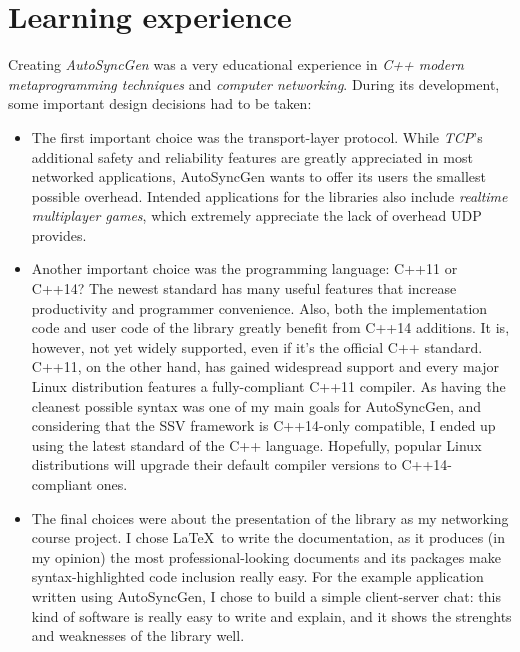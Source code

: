 \documentclass{report}
\begin{document}
            \section{Learning experience}

                Creating \emph{AutoSyncGen} was a very educational experience in \emph{C++ modern metaprogramming techniques} and \emph{computer networking}.
                During its development, some important design decisions had to be taken:

                \begin{itemize}
                  \item The first important choice was the transport-layer protocol. While \emph{TCP}'s additional safety and reliability features are greatly appreciated in most networked applications, AutoSyncGen wants to offer its users the smallest possible overhead. Intended applications for the libraries also include \emph{realtime multiplayer games}, which extremely appreciate the lack of overhead UDP provides.
                  \item Another important choice was the programming language: C++11 or C++14? The newest standard has many useful features that increase productivity and programmer convenience. Also, both the implementation code and user code of the library greatly benefit from C++14 additions. It is, however, not yet widely supported, even if it's the official C++ standard.
                  C++11, on the other hand, has gained widespread support and every major Linux distribution features a fully-compliant C++11 compiler.
                  As having the cleanest possible syntax was one of my main goals for AutoSyncGen, and considering that the SSV framework is C++14-only compatible, I ended up using the latest standard of the C++ language. Hopefully, popular Linux distributions will upgrade their default compiler versions to C++14-compliant ones.
                  \item The final choices were about the presentation of the library as my networking course project. I chose \LaTeX\ to write the documentation, as it produces (in my opinion) the most professional-looking documents and its packages make syntax-highlighted code inclusion really easy. For the example application written using AutoSyncGen, I chose to build a simple client-server chat: this kind of software is really easy to write and explain, and it shows the strenghts and weaknesses of the library well.
                \end{itemize}
\end{document}
